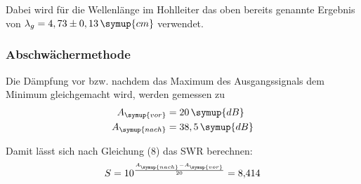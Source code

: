 Dabei wird für die Wellenlänge im Hohlleiter das oben bereits genannte Ergebnis von $\lambda_g = 4,73 \pm 0,13 \, \symup{cm}$ verwendet.

\subsubsection{Abschwächermethode}
Die Dämpfung vor bzw. nachdem das Maximum des Ausgangssignals dem Minimum
gleichgemacht wird, werden gemessen zu
\begin{align*}
  A_\symup{vor} &= 20 \, \symup{dB} \\
  A_\symup{nach} &= 38,5 \, \symup{dB}
\end{align*}

Damit lässt sich nach Gleichung (8) das SWR berechnen:
\begin{equation*}
  S = 10^{\frac{A_\symup{nach}-A_\symup{vor}}{20}} = \num{8,414}
\end{equation*}
